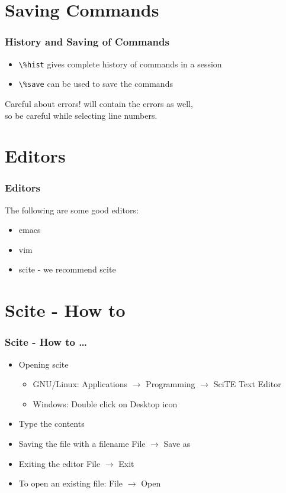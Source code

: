 \documentclass[14pt,compress]{beamer}
\newcommand{\typ}[1]{\lstinline{#1}}
\newcommand{\kwrd}[1]{ \texttt{\textbf{\color{blue}{#1}}}  }
\begin{document}
\section{Saving Commands}
\begin{frame}[fragile]
\frametitle{History and Saving of Commands}
\begin{itemize}
\item \typ{\%hist} gives complete history of commands in a session
\item \typ{\%save} can be used to save the commands
\end{itemize}
\begin{block}{Careful about errors!}
  \kwrd{\%hist} will contain the errors as well,\\
  so be careful while selecting line numbers.
\end{block}
\end{frame}

\section{Editors}
\begin{frame}[fragile]
  \frametitle{Editors}
  The following are some good editors:
  \begin{itemize}
  \item emacs
  \item vim
  \item scite - we recommend scite
  \end{itemize}
\end{frame}

\section{Scite - How to}
\begin{frame}[fragile]
  \frametitle{Scite - How to \ldots}
  \begin{itemize}
  \item Opening scite
    \begin{itemize}
    \item GNU/Linux: Applications $\rightarrow$ Programming $\rightarrow$ SciTE Text Editor
    \item Windows: Double click on Desktop icon
    \end{itemize}
  \item Type the contents
  \item Saving the file with a filename \alert{File $\rightarrow$ Save as}
  \item Exiting the editor  \alert{File $\rightarrow$ Exit}
  \item To open an existing file: \alert{File $\rightarrow$ Open}
  \end{itemize}
\end{frame}
\end{document}
